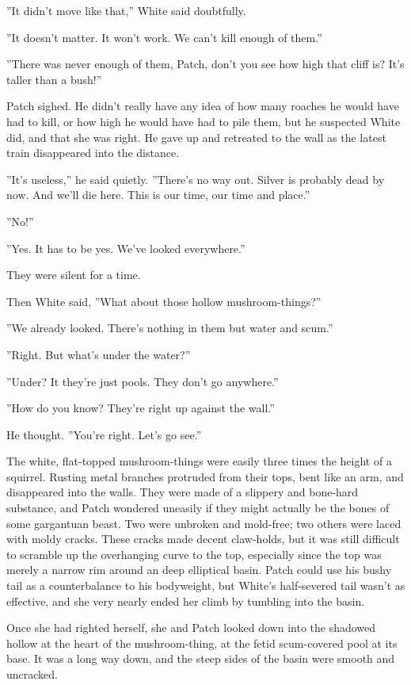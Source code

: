 \documentclass[12pt]{book}
\begin{document}
 ''It didn't move like that,'' White said doubtfully.\par
 ''It doesn't matter. It won't work. We can't kill enough of them.''\par
 ''There was never enough of them, Patch, don't you see how high that cliff is? It's taller than a bush!''\par
 Patch sighed. He didn't really have any idea of how many roaches he would have had to kill, or how high he would have had to pile them, but he suspected White did, and that she was right. He gave up and retreated to the wall as the latest train disappeared into the distance.\par
 ''It's useless,'' he said quietly. ''There's no way out. Silver is probably dead by now. And we'll die here. This is our time, our time and place.''\par
 ''No!''\par
 ''Yes. It has to be yes. We've looked everywhere.''\par
 They were silent for a time.\par
 Then White said, ''What about those hollow mushroom-things?''\par
 ''We already looked. There's nothing in them but water and scum.''\par
 ''Right. But what's under the water?''\par
 ''Under? It %
 they're just pools. They don't go anywhere.''\par
 ''How do you know? They're right up against the wall.''\par
 He thought. ''You're right. Let's go see.''\par
 The white, flat-topped mushroom-things were easily three times the height of a squirrel. Rusting metal branches protruded from their tops, bent like an arm, and disappeared into the walls. They were made of a slippery and bone-hard substance, and Patch wondered uneasily if they might actually be the bones of some gargantuan beast. Two were unbroken and mold-free; two others were laced with moldy cracks. These cracks made decent claw-holds, but it was still difficult to scramble up the overhanging curve to the top, especially since the top was merely a narrow rim around an deep elliptical basin. Patch could use his bushy tail as a counterbalance to his bodyweight, but White's half-severed tail wasn't as effective, and she very nearly ended her climb by tumbling into the basin.\par
 Once she had righted herself, she and Patch looked down into the shadowed hollow at the heart of the mushroom-thing, at the fetid scum-covered pool at its base. It was a long way down, and the steep sides of the basin were smooth and uncracked.\par
\end{document}
